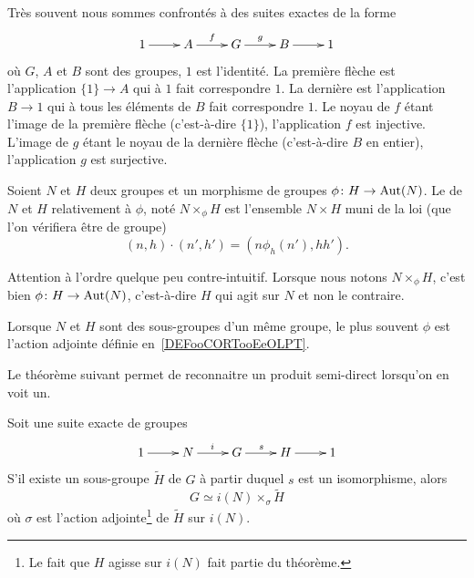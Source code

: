 Très souvent nous sommes confrontés à des suites exactes de la forme
\begin{equation}
    \xymatrix{%
    1 \ar[r]& A\ar[r]^f&G\ar[r]^g&B\ar[r]&1
       }
\end{equation}
où \( G\), \( A\) et \( B\) sont des groupes, \( 1\) est l'identité. La première flèche est l'application \( \{ 1 \}\to A\) qui à \( 1\) fait correspondre \( 1\). La dernière est l'application \( B\to 1\) qui à tous les éléments de \( B\) fait correspondre \( 1\). Le noyau de \( f\) étant l'image de la première flèche (c'est-à-dire \( \{ 1 \}\)), l'application \( f\) est injective. L'image de \( g\) étant le noyau de la dernière flèche (c'est-à-dire \( B\) en entier), l'application \( g\) est surjective.

\begin{definition}     \label{DEFooKWEHooISNQzi}
    Soient \( N\) et \( H\) deux groupes et un morphisme de groupes \( \phi\colon H\to \operatorname{Aut}(N)\). Le  de \( N\) et \( H\) relativement à \( \phi\), noté \( N\times_{\phi}H\) est l'ensemble \( N\times H\) muni de la loi (que l'on vérifiera être de groupe)
    \begin{equation}\label{EqDRgbBI}
        (n,h)\cdot (n',h')=(n\phi_h(n'),hh').
    \end{equation}
\end{definition}
Attention à l'ordre quelque peu contre-intuitif. Lorsque nous notons \( N\times_{\phi}H\), c'est bien \( \phi\colon H\to \operatorname{Aut}(N)\), c'est-à-dire \( H\) qui agit sur \( N\) et non le contraire.

Lorsque \( N\) et \( H\) sont des sous-groupes d'un même groupe, le plus souvent \( \phi\) est l'action adjointe définie en~\ref{DEFooCORTooEeOLPT}.

Le théorème suivant permet de reconnaitre un produit semi-direct lorsqu'on en voit un.
\begin{theorem}       \label{THOooZNYTooPhnIdE}
    Soit une suite exacte de groupes
    \begin{equation}
    \xymatrix{%
    1 \ar[r]        & N\ar[r]^i&G\ar[r]^s&H\ar[r]&1
       }
    \end{equation}
    S'il existe un sous-groupe \( \tilde H\) de \( G\) à partir duquel \( s\) est un isomorphisme, alors
    \begin{equation}
        G\simeq i(N)\times_{\sigma}\tilde H
    \end{equation}
    où \( \sigma\) est l'action adjointe\footnote{Le fait que \( H\) agisse sur \( i(N)\) fait partie du théorème.} de \( \tilde H\) sur \( i(N)\).
\end{theorem}

